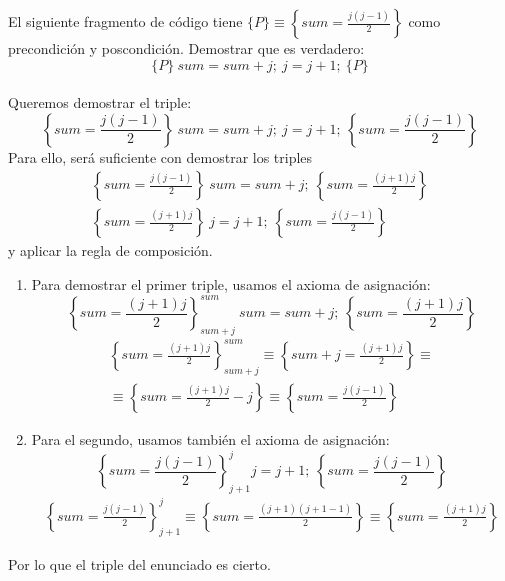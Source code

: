 \begin{ejercicio}
    El siguiente fragmento de código tiene $\{P\}\equiv \left\{sum = \frac{j(j-1)}{2}\right\}$ como precondición y poscondición. Demostrar que es verdadero:
    \begin{equation*}
        \{P\}\ sum=sum+j;\ j=j+1;\ \{P\}
    \end{equation*}~\\

    Queremos demostrar el triple:
    \begin{equation*}
        \left\{sum=\frac{j(j-1)}{2} \right\}\ sum=sum+j;\ j=j+1;\ \left\{sum=\frac{j(j-1)}{2}\right\}
    \end{equation*}
    Para ello, será suficiente con demostrar los triples
    \begin{gather*}
        \left\{sum = \frac{j(j-1)}{2} \right\}\ sum = sum + j;\ \left\{sum = \frac{(j+1)j}{2} \right\} \\
        \left\{sum = \frac{(j+1)j}{2} \right\}\ j=j+1;\ \left\{sum = \frac{j(j-1)}{2}\right\}
    \end{gather*}
    y aplicar la regla de composición.

    \begin{enumerate}
        \item Para demostrar el primer triple, usamos el axioma de asignación:
            \begin{equation*}
                \left\{sum = \frac{(j+1)j}{2} \right\}^{sum}_{sum+j}\ sum = sum + j;\ \left\{sum = \frac{(j+1)j}{2} \right\} 
            \end{equation*}
            \begin{gather*}
                \left\{sum = \frac{(j+1)j}{2} \right\}^{sum}_{sum+j} \equiv \left\{sum+j = \frac{(j+1)j}{2} \right\} \equiv \\ 
                \equiv \left\{sum = \frac{(j+1)j}{2}-j \right\} \equiv \left\{sum = \frac{j(j-1)}{2} \right\}
            \end{gather*}
        \item Para el segundo, usamos también el axioma de asignación:
            \begin{equation*}
                \left\{sum = \frac{j(j-1)}{2}\right\}^j_{j+1} j=j+1;\ \left\{sum = \frac{j(j-1)}{2}\right\}
            \end{equation*}
            \begin{gather*}
                \left\{sum = \frac{j(j-1)}{2}\right\}^j_{j+1} \equiv \left\{sum = \frac{(j+1)(j+1-1)}{2}\right\} \equiv \left\{sum = \frac{(j+1)j}{2}\right\}
            \end{gather*}
    \end{enumerate}
    Por lo que el triple del enunciado es cierto.

\end{ejercicio}

